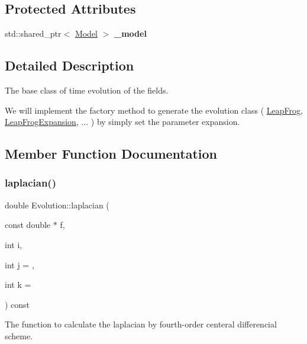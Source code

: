 \subsection*{Protected Attributes}
\begin{DoxyCompactItemize}
\item 
\mbox{\label{class_evolution_aa3dd9e68324ac958960e9b6e600940cf}} 
std\+::shared\+\_\+ptr$<$ \mbox{\hyperlink{class_model}{Model}} $>$ {\bfseries \+\_\+model}
\end{DoxyCompactItemize}


\subsection{Detailed Description}
The base class of time evolution of the fields. 

We will implement the factory method to generate the evolution class ( \mbox{\hyperlink{class_leap_frog}{Leap\+Frog}}, \mbox{\hyperlink{class_leap_frog_expansion}{Leap\+Frog\+Expansion}}, ... ) by simply set the parameter \textquotesingle{}expansion\textquotesingle{}. 

\subsection{Member Function Documentation}
\mbox{\label{class_evolution_af86656987a077304eacaa56100377be3}} 
\subsubsection{\texorpdfstring{laplacian()}{laplacian()}}
{\footnotesize\ttfamily double Evolution\+::laplacian (\begin{DoxyParamCaption}\item[{const double $\ast$}]{f,  }\item[{int}]{i,  }\item[{int}]{j = {},  }\item[{int}]{k = {} }\end{DoxyParamCaption}) const\hspace{0.3cm}{\ttfamily [protected]}}



The function to calculate the laplacian by fourth-\/order centeral differencial scheme. 



